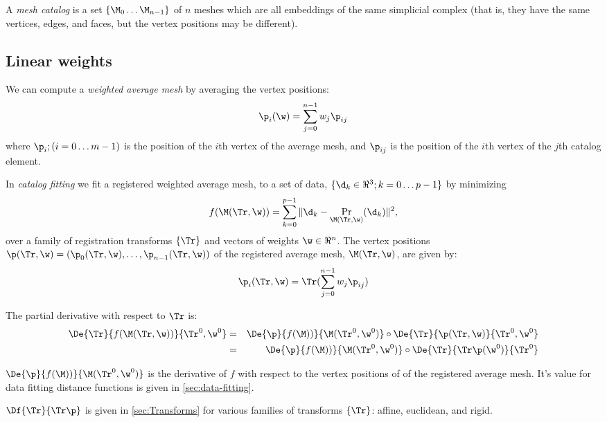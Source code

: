 \label{sec:Averaging}

A {\it mesh catalog} is a set $\{ \M_0 \ldots \M_{n-1} \}$
of $n$ meshes which are all embeddings
of the same simplicial complex
(that is, they have the same vertices, edges, and faces,
but the vertex positions may be different).

\subsection{Linear weights}
\label{sec:Linear-weights}

We can compute a {\it weighted average mesh} by averaging the vertex positions:
\begin{equation}
\p_i(\w) = \sum_{j=0}^{n-1} w_j \p_{ij}
\end{equation}
where $\p_{i}; (i=0 \ldots m-1)$ is the position of the $i$th vertex of the average mesh,
and $\p_{ij}$ is the position of the $i$th vertex of the $j$th catalog element.

In {\it catalog fitting} we fit a registered weighted average mesh,
to a set of data, $\{ \d_k \in \Re^3; k=0 \ldots p-1 \}$
by minimizing
\begin{equation}
f(\M(\Tr,\w)) = \sum_{k=0}^{p-1} \| \d_k - \Pr_{\M(\Tr,\w)} (\d_k) \|^2 ,
\end{equation}
over a family of registration transforms $\{\Tr\}$
and vectors of weights $\w \in \Re^n$.
The vertex positions $\p(\Tr,\w) = (\p_0(\Tr,\w), \ldots , \p_{n-1}(\Tr,\w))$
of the registered average mesh, $\M(\Tr,\w)$, are given by:
\begin{equation}
\p_i(\Tr,\w) = \Tr ( \sum_{j=0}^{n-1} w_j \p_{ij} )
\end{equation}

The partial derivative with respect to $\Tr$
is:
\begin{eqnarray}
\De{\Tr}{f(\M(\Tr,\w))}{\Tr^0,\w^0}
& = &
\De{\p}{f(\M))}{\M(\Tr^0,\w^0)}
\circ
\De{\Tr}{\p(\Tr,\w)}{\Tr^0,\w^0}
\\
& = &
\De{\p}{f(\M))}{\M(\Tr^0,\w^0)}
\circ
\De{\Tr}{\Tr\p(\w^0)}{\Tr^0}
\nonumber
\end{eqnarray}

$\De{\p}{f(\M))}{\M(\Tr^0,\w^0)}$ is the derivative of $f$ with respect to
the vertex positions of of the registered average mesh.
It's value for data fitting distance functions
is given in \autoref{sec:data-fitting}.

$\Df{\Tr}{\Tr\p}$ is given in \autoref{sec:Transforms}
for various families of transforms $\{\Tr\}$: affine, euclidean, and rigid.

